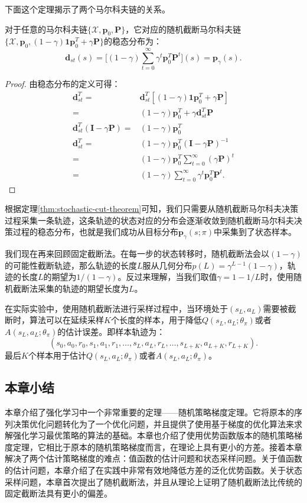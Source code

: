 下面这个定理揭示了两个马尔科夫链的关系。
\begin{theorem}\label{thm:stochastic-cut-theorem}
    对于任意的马尔科夫链$\{\mathcal{X}, \mathbf{p}_0, \mathbf{P}\}$，它对应的随机截断马尔科夫链$\{\mathcal{X}, \mathbf{p}_0, (1 - \gamma)\mathbf{1}\mathbf{p}^T_0 + \gamma \mathbf{P}\}$的稳态分布为：
    \begin{equation}
        \mathbf{d}_{st}(s) = \bigg[(1 - \gamma) \sum^{\infty}_{t=0} \gamma^t \mathbf{p}^T_0 \mathbf{P}^t\bigg](s) = \mathbf{p}_{\gamma}(s).
    \end{equation}
\end{theorem}
\begin{proof}
    由稳态分布的定义可得：
    \begin{align*}
        \mathbf{d}^T_{st} =& \mathbf{d}^T_{st} [(1 - \gamma)\mathbf{1}\mathbf{p}^T_0 + \gamma \mathbf{P}]\\
        =& (1 - \gamma) \mathbf{p}^T_0 + \gamma \mathbf{d}^T_{st} \mathbf{P}\\
        \mathbf{d}^T_{st}(\mathbf{I} - \gamma \mathbf{P})=& (1 - \gamma) \mathbf{p}^T_0\\
        \mathbf{d}^T_{st} =& (1 - \gamma)\mathbf{p}^T_0 (\mathbf{I} - \gamma \mathbf{P})^{-1}\\
        =& (1 - \gamma)\mathbf{p}^T_0 \sum^{\infty}_{t=0}(\gamma \mathbf{P})^t\\
        =& (1 - \gamma)\sum^{\infty}_{t=0}\gamma^t \mathbf{p}^T_0 \mathbf{P}^t.
    \end{align*}
\end{proof}

根据定理\ref{thm:stochastic-cut-theorem}可知，我们只需要从随机截断马尔科夫决策过程采集一条轨迹，这条轨迹的状态对应的分布会逐渐收敛到随机截断马尔科夫决策过程的稳态分布，也就是我们成功从目标分布$\mathbf{p}_{\gamma}(s; \pi)$中采集到了状态样本。

我们现在再来回顾固定截断法。在每一步的状态转移时，随机截断法会以$(1 - \gamma)$的可能性截断轨迹，那么轨迹的长度$L$服从几何分布$p(L) = \gamma^{L-1} (1 - \gamma)$，轨迹的长度$L$的期望为$1/(1 - \gamma)$。反过来理解，当我们取值$\gamma = 1 - 1/L$时，使用随机截断法采集的轨迹的期望长度为$L$。

\begin{remark}
    在实际实验中，使用随机截断法进行采样过程中，当环境处于$(s_L, a_L)$需要被截断时，算法可以在延续采样$K$个长度的样本，用于降低$Q(s_L, a_L;\theta_\pi)$或者$A(s_L, a_L;\theta_\pi)$的估计误差。即样本轨迹为：
    \begin{equation}
        (s_0, a_0, r_0, s_1, a_1, r_1, \ldots, s_L, a_L, r_L, \ldots, s_{L+K}, a_{L+K}, r_{L+K}).
    \end{equation}
    最后$K$个样本用于估计$Q(s_L, a_L;\theta_\pi)$或者$A(s_L, a_L;\theta_\pi)$。
\end{remark}

\subsection{本章小结}
本章介绍了强化学习中一个非常重要的定理——随机策略梯度定理。它将原本的序列决策优化问题转化为了一个优化问题，并且提供了使用基于梯度的优化算法来求解强化学习最优策略的算法的基础。本章也介绍了使用优势函数版本的随机策略梯度定理，它相比于原本的随机策略梯度而言，在理论上具有更小的方差。接着本章解决了两个估计策略梯度的难点：值函数的估计问题和状态采样问题。关于值函数的估计问题，本章介绍了在实践中非常有效地降低方差的泛化优势函数。关于状态采样问题，本章首次提出了随机截断法，并且从理论上证明了随机截断法比传统的固定截断法具有更小的偏差。
